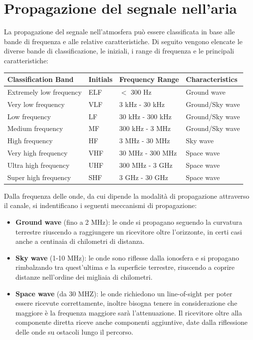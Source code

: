 \section*{Propagazione del segnale nell'aria}
La propagazione del segnale nell'atmosfera può essere classificata in base alle bande di frequenza e alle relative caratteristiche. Di seguito vengono elencate le diverse bande di classificazione, le iniziali, i range di frequenza e le principali caratteristiche:
\begin{table}[h!]
\centering
\begin{tabular}{llll}
\hline
\textbf{Classification Band} & \textbf{Initials} & \textbf{Frequency Range} & \textbf{Characteristics} \\
\hline
Extremely low frequency & ELF & $<$ 300 Hz & Ground wave \\
Very low frequency & VLF & 3 kHz - 30 kHz & Ground/Sky wave \\
Low frequency & LF & 30 kHz - 300 kHz & Ground/Sky wave \\
Medium frequency & MF & 300 kHz - 3 MHz & Ground/Sky wave \\
High frequency & HF & 3 MHz - 30 MHz & Sky wave \\
Very high frequency & VHF & 30 MHz - 300 MHz & Space wave \\
Ultra high frequency & UHF & 300 MHz - 3 GHz & Space wave \\
Super high frequency & SHF & 3 GHz - 30 GHz & Space wave \\
\hline
\end{tabular}
\end{table}


Dalla frequenza delle onde, da cui dipende la modalità di propagazione attraverso il canale, si indentificano i seguenti meccanismi di propagazione:

\begin{itemize}
    \item \textbf{Ground wave} (fino a 2 MHz): le onde si propagano seguendo la curvatura terrestre riuscendo a raggiungere un ricevitore oltre l'orizzonte, in certi casi anche a centinaia di chilometri di distanza.
    \item \textbf{Sky wave} (1-10 MHz): le onde sono riflesse dalla ionosfera e si propagano rimbalzando tra quest'ultima e la superficie terrestre, riuscendo a coprire distanze nell'ordine dei migliaia di chilometri.
    \item \textbf{Space wave} (da 30 MHZ): le onde richiedono un line-of-sight per poter essere ricevute correttamente, inoltre bisogna tenere in considerazione che maggiore è la frequenza maggiore sarà l'attenuazione. Il ricevitore oltre alla componente diretta riceve anche componenti aggiuntive, date dalla riflessione delle onde su ostacoli lungo il percorso.
\end{itemize}



